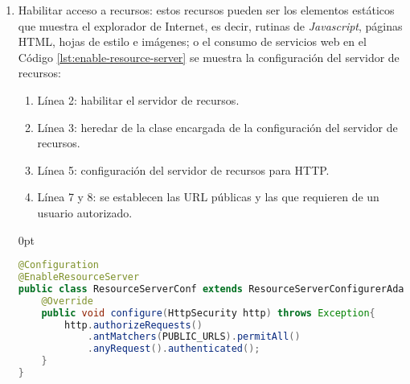 \begin{enumerate}
\begin{adjustwidth}{\listingfixwidth}{0pt}
\begin{lstlisting}[language=Java, caption={Derivación de la constraseña de usuario.}, captionpos=b, label={lst:kdf}]
public byte[] derivate(char[] password, byte[] salt) throws NoSuchAlgorithmException, InvalidKeySpecException{
	PBEKeySpec spec = new PBEKeySpec(password, salt, it, length);
	SecretKeyFactory skf = SecretKeyFactory.getInstance(algorithm);
	return skf.generateSecret(spec).getEncoded();
}
\end{lstlisting}
\end{adjustwidth}

	\item Habilitar acceso a recursos: estos recursos pueden ser los elementos estáticos que muestra el explorador de Internet, es decir, rutinas de \textit{Javascript}, páginas HTML, hojas de estilo e imágenes; o el consumo de servicios web en el Código \ref{lst:enable-resource-server} se muestra la configuración del servidor de recursos:

	\begin{enumerate}
		\item Línea 2: habilitar el servidor de recursos.
		\item Línea 3: heredar de la clase encargada de la configuración del servidor de recursos.
		\item Línea 5: configuración del servidor de recursos para HTTP.
		\item Línea 7 y 8: se establecen las URL públicas y las que requieren de un usuario autorizado.
	\end{enumerate}

\begin{adjustwidth}{\listingfixwidth}{0pt}
\begin{lstlisting}[language=Java, caption={Clase de configuración de servidor de recursos.}, captionpos=b, label={lst:enable-resource-server}]
@Configuration
@EnableResourceServer
public class ResourceServerConf extends ResourceServerConfigurerAdapter{
	@Override
	public void configure(HttpSecurity http) throws Exception{
		http.authorizeRequests()
			.antMatchers(PUBLIC_URLS).permitAll()
			.anyRequest().authenticated();
	}
}
\end{lstlisting}
\end{adjustwidth}
\end{enumerate}

